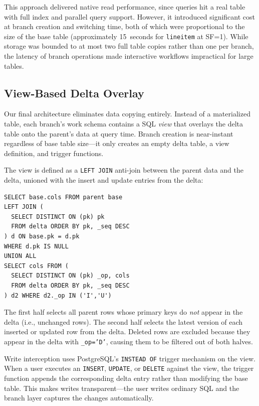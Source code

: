 \documentclass[sigplan, nonacm]{acmart}
\begin{document}
This approach delivered native read performance, since queries hit a real table with full index and parallel query support. However, it introduced significant cost at branch creation and switching time, both of which were proportional to the size of the base table (approximately 15~seconds for \texttt{lineitem} at SF=1). While storage was bounded to at most two full table copies rather than one per branch, the latency of branch operations made interactive workflows impractical for large tables.

\subsection{View-Based Delta Overlay}

Our final architecture eliminates data copying entirely. Instead of a materialized table, each branch's work schema contains a SQL \emph{view} that overlays the delta table onto the parent's data at query time. Branch creation is near-instant regardless of base table size---it only creates an empty delta table, a view definition, and trigger functions.

The view is defined as a \texttt{LEFT~JOIN} anti-join between the parent data and the delta, unioned with the insert and update entries from the delta:

\begin{verbatim}
SELECT base.cols FROM parent base
LEFT JOIN (
  SELECT DISTINCT ON (pk) pk
  FROM delta ORDER BY pk, _seq DESC
) d ON base.pk = d.pk
WHERE d.pk IS NULL
UNION ALL
SELECT cols FROM (
  SELECT DISTINCT ON (pk) _op, cols
  FROM delta ORDER BY pk, _seq DESC
) d2 WHERE d2._op IN ('I','U')
\end{verbatim}

The first half selects all parent rows whose primary keys do \emph{not} appear in the delta (i.e., unchanged rows). The second half selects the latest version of each inserted or updated row from the delta. Deleted rows are excluded because they appear in the delta with \texttt{\_op='D'}, causing them to be filtered out of both halves.

Write interception uses PostgreSQL's \texttt{INSTEAD~OF} trigger mechanism on the view. When a user executes an \texttt{INSERT}, \texttt{UPDATE}, or \texttt{DELETE} against the view, the trigger function appends the corresponding delta entry rather than modifying the base table. This makes writes transparent---the user writes ordinary SQL and the branch layer captures the changes automatically.
\end{document}
